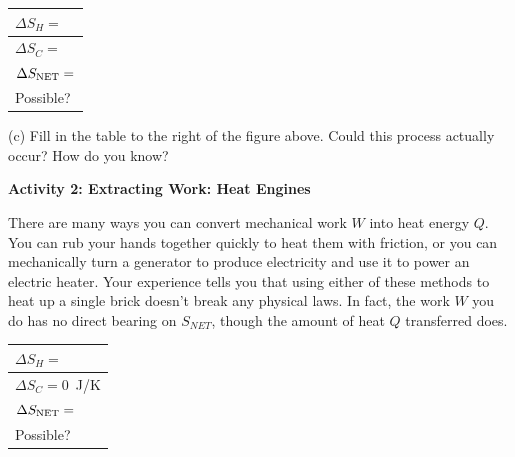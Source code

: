 \begin{center}
\hspace{0.3in}
{\renewcommand{\arraystretch}{1.8}
\begin{tabular}{|L{1.6in}|} 
\hline $\Delta S_H =$ \\ 
\hline $\Delta S_C =$ \\ 
\hline $\Delta S_{\rm NET} =$ \\ 
\hline Possible? \\ 
\hline 
\end{tabular} 
}
\end{center}

(c) Fill in the table to the right of the figure above.   Could this process actually occur?  How do you know?
\answerspace{0.6 in}

\textbf{Activity 2: Extracting Work: Heat Engines}

There are many ways you can convert mechanical work $W$ into heat energy $Q$.  You can rub your hands together quickly to heat them with friction, or you can mechanically turn a generator to produce electricity and use it to power an electric heater.  Your experience tells you that using either of these methods to heat up a single brick doesn't break any physical laws.  In fact, the work $W$ you do has no direct bearing on $S_{NET}$, though the amount of heat $Q$ transferred does.

\begin{center}
\hspace{0.3in}
{\renewcommand{\arraystretch}{1.8}
\begin{tabular}{|L{1.6in}|} 
\hline $\Delta S_H =$ \\ 
\hline $\Delta S_C = 0$~J/K \\ 
\hline $\Delta S_{\rm NET} =$ \\ 
\hline Possible? \\ 
\hline 
\end{tabular} 
}
\end{center}

